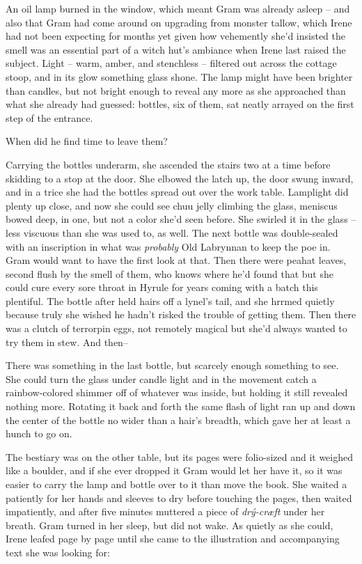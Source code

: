 \documentclass[../FGP.tex]{subfiles}
\begin{document}
An oil lamp burned in the window, which meant Gram was already asleep -- and also that Gram had come around on upgrading from monster tallow, which Irene had not been expecting for months yet given how vehemently she'd insisted the smell was an essential part of a witch hut's ambiance when Irene last raised the subject. Light -- warm, amber, and stenchless -- filtered out across the cottage stoop, and in its glow something glass shone. The lamp might have been brighter than candles, but not bright enough to reveal any more as she approached than what she already had guessed: bottles, six of them, sat neatly arrayed on the first step of the entrance. 

When did he find time to leave them?

Carrying the bottles underarm, she ascended the stairs two at a time before skidding to a stop at the door. She elbowed the latch up, the door swung inward, and in a trice she had the bottles spread out over the work table. Lamplight did plenty up close, and now she could see chuu jelly climbing the glass, meniscus bowed deep, in one, but not a color she'd seen before. She swirled it in the glass --less viscuous than she was used to, as well.  The next bottle was double-sealed with an inscription in what was \emph{probably} Old Labrynnan to keep the poe in. Gram would want to have the first look at that. Then there were peahat leaves, second flush by the smell of them, who knows where he'd found that but she could cure every sore throat in Hyrule for years coming with a batch this plentiful. The bottle after held hairs off a lynel's tail, and she hrrmed quietly because truly she wished he hadn't risked the trouble of getting them. Then there was a clutch of terrorpin eggs, not remotely magical but she'd always wanted to try them in stew. And then--

There was something in the last bottle, but scarcely enough something to see. She could turn the glass under candle light and in the movement catch a rainbow-colored shimmer off of whatever was inside, but holding it still revealed nothing more. Rotating it back and forth the same flash of light ran up and down the center of the bottle no wider than a hair's breadth, which gave her at least a hunch to go on. 

The bestiary was on the other table, but its pages were folio-sized and it weighed like a boulder, and if she ever dropped it Gram would let her have it, so it was easier to carry the lamp and bottle over to it than move the book. She waited a patiently for her hands and sleeves to dry before touching the pages, then waited impatiently, and after five minutes muttered a piece of \emph{drý-cræft} 
under her breath. Gram turned in her sleep, but did not wake. As quietly as she could, Irene leafed page by page until she came to the illustration and accompanying text she was looking for:
\end{document}
